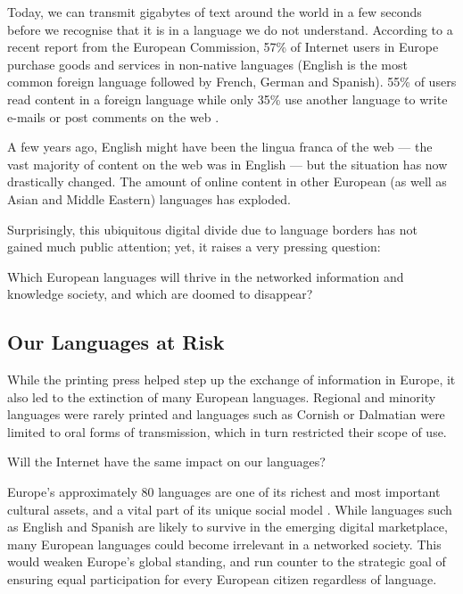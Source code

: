 \begin{multicols}{2}
Today, we can transmit gigabytes of text around the world in a few seconds before we recognise that it is in a language we do not understand. According to a recent report from the European Commission, 57\% of Internet users in Europe purchase goods and services in non-native languages (English is the most common foreign language followed by French, German and Spanish). 55\% of users read content in a foreign language while only 35\% use another language to write e-mails or post comments on the web \cite{EC1}. 

A few years ago, English might have been the lingua franca of the web — the vast majority of content on the web was in English — but the situation has now drastically changed. The amount of online content in other European (as well as Asian and Middle Eastern) languages has exploded.

Surprisingly, this ubiquitous digital divide due to language borders has not gained much public attention; yet, it raises a very pressing question: 

Which European languages will thrive in the networked information and knowledge society, and which are doomed to disappear?

\subsection{Our Languages at Risk}

While the printing press helped step up the exchange of information in Europe, it also led to the extinction of many European languages. Regional and minority languages were rarely printed and languages such as Cornish or Dalmatian were limited to oral forms of transmission, which in turn restricted their scope of use. 

Will the Internet have the same impact on our languages?

 Europe’s approximately 80 languages are one of its richest and most important cultural assets, and a vital part of its unique social model \cite{EC2}. While languages such as English and Spanish are likely to survive in the emerging digital marketplace, many European languages could become irrelevant in a networked society. This would weaken Europe’s global standing, and run counter to the strategic goal of ensuring equal participation for every European citizen regardless of language. 



\end{multicols}
